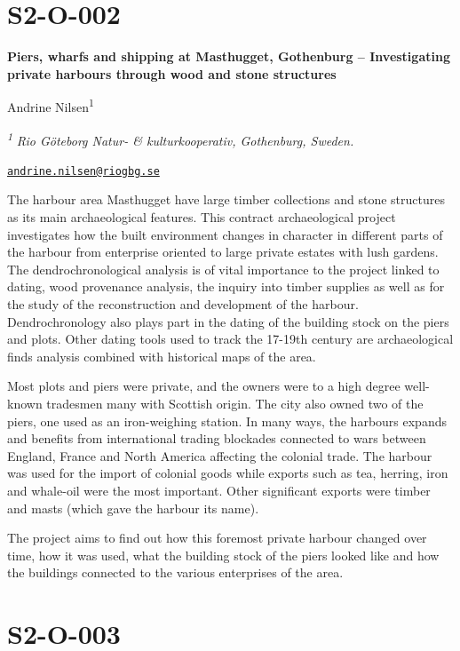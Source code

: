 \documentclass[
]{book}
\begin{document}
\hypertarget{s2-o-002}{%
\section*{S2-O-002}\label{s2-o-002}}

\textbf{Piers, wharfs and shipping at Masthugget, Gothenburg -- Investigating private harbours through wood and stone structures}

Andrine Nilsen\textsuperscript{1}

\textsuperscript{\emph{1}} \emph{Rio Göteborg Natur- \& kulturkooperativ, Gothenburg, Sweden.}

\href{mailto:andrine.nilsen@riogbg.se}{\nolinkurl{andrine.nilsen@riogbg.se}}

The harbour area Masthugget have large timber collections and stone structures as its main archaeological features. This contract archaeological project investigates how the built environment changes in character in different parts of the harbour from enterprise oriented to large private estates with lush gardens. The dendrochronological analysis is of vital importance to the project linked to dating, wood provenance analysis, the inquiry into timber supplies as well as for the study of the reconstruction and development of the harbour. Dendrochronology also plays part in the dating of the building stock on the piers and plots. Other dating tools used to track the 17-19th century are archaeological finds analysis combined with historical maps of the area.

Most plots and piers were private, and the owners were to a high degree well-known tradesmen many with Scottish origin. The city also owned two of the piers, one used as an iron-weighing station. In many ways, the harbours expands and benefits from international trading blockades connected to wars between England, France and North America affecting the colonial trade. The harbour was used for the import of colonial goods while exports such as tea, herring, iron and whale-oil were the most important. Other significant exports were timber and masts (which gave the harbour its name).

The project aims to find out how this foremost private harbour changed over time, how it was used, what the building stock of the piers looked like and how the buildings connected to the various enterprises of the area.

\hypertarget{s2-o-003}{%
\section*{S2-O-003}\label{s2-o-003}}
\end{document}
